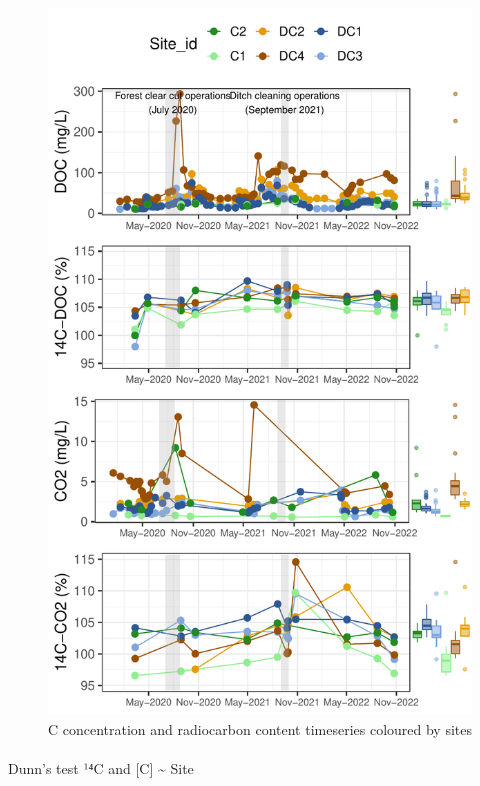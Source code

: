 \documentclass[
]{article}
\makeatletter
\let\oldparagraph\paragraph
\renewcommand{\paragraph}{
    \@ifstar
      \xxxParagraphStar
      \xxxParagraphNoStar
  }
\newcommand{\xxxParagraphStar}[1]{\oldparagraph*{#1}\mbox{}}
\newcommand{\xxxParagraphNoStar}[1]{\oldparagraph{#1}\mbox{}}
\makeatother
\begin{document}
\begin{figure}[H]

{\centering \includegraphics{index_files/figure-pdf/unnamed-chunk-3-1.pdf}

}

\caption{C concentration and radiocarbon content timeseries coloured by
sites}

\end{figure}%

\paragraph{Dunn's test \textbar{} ¹⁴C and {[}C{]} \textasciitilde{}
Site}\label{dunns-test-uxb9ux2074c-and-c-site}
\end{document}

